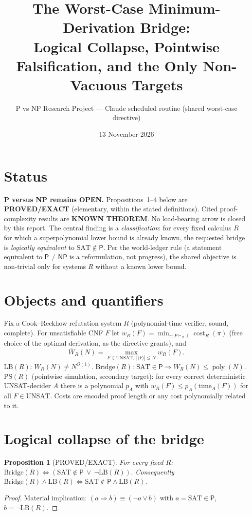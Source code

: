 \documentclass[11pt]{article}
\title{The Worst-Case Minimum-Derivation Bridge:\\ Logical Collapse, Pointwise Falsification, and the Only Non-Vacuous Targets}
\author{P vs NP Research Project --- Claude scheduled routine (shared worst-case directive)}
\date{13 November 2026}
\newtheorem{proposition}{Proposition}
\newcommand{\SAT}{\mathrm{SAT}}
\newcommand{\UNSAT}{\mathrm{UNSAT}}
\newcommand{\Pc}{\mathsf P}
\newcommand{\NP}{\mathsf{NP}}
\newcommand{\poly}{\operatorname{poly}}
\begin{document}
\maketitle

\section*{Status}
\textbf{P versus NP remains OPEN.} Propositions~1--4 below are \textbf{PROVED/EXACT}
(elementary, within the stated definitions). Cited proof-complexity results are
\textbf{KNOWN THEOREM}. No load-bearing arrow is closed by this report.
The central finding is a \emph{classification}: for every fixed calculus $R$ for
which a superpolynomial lower bound is already known, the requested bridge is
\emph{logically equivalent} to $\SAT\notin\Pc$. Per the world-ledger rule
(a statement equivalent to $\Pc\neq\NP$ is a reformulation, not progress), the
shared objective is non-trivial only for systems $R$ without a known lower bound.

\section*{Objects and quantifiers}
Fix a Cook--Reckhow refutation system $R$ (polynomial-time verifier, sound, complete).
For unsatisfiable CNF $F$ let $w_R(F)=\min_{\pi:F\vdash_R\bot}\operatorname{cost}_R(\pi)$
(free choice of the optimal derivation, as the directive grants), and
\[
 \overline W_R(N)=\max_{F\in\UNSAT,\ |\langle F\rangle|\le N} w_R(F).
\]
$\mathrm{LB}(R)$: $\overline W_R(N)\neq N^{O(1)}$.
$\mathrm{Bridge}(R)$: $\SAT\in\Pc\Rightarrow \overline W_R(N)\le\poly(N)$.
$\mathrm{PS}(R)$ (pointwise simulation, secondary target): for every correct deterministic
UNSAT-decider $A$ there is a polynomial $p_A$ with $w_R(F)\le p_A(\mathrm{time}_A(F))$ for all $F\in\UNSAT$.
Costs are encoded proof length or any cost polynomially related to it.

\section{Logical collapse of the bridge}
\begin{proposition}[PROVED/EXACT]
For every fixed $R$: $\mathrm{Bridge}(R)\iff(\SAT\notin\Pc\ \vee\ \neg\mathrm{LB}(R))$.
Consequently $\mathrm{Bridge}(R)\wedge\mathrm{LB}(R)\iff \SAT\notin\Pc\wedge \mathrm{LB}(R)$.
\end{proposition}
\begin{proof}
Material implication: $(a\Rightarrow b)\equiv(\neg a\vee b)$ with $a=\SAT\in\Pc$, $b=\neg\mathrm{LB}(R)$.
\end{proof}
\end{document}

